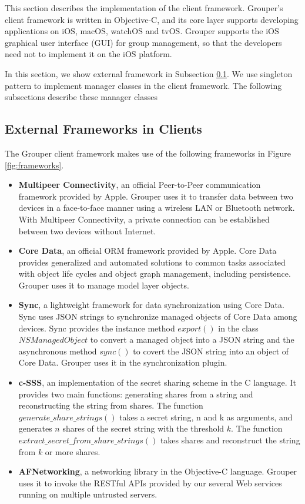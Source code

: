\documentclass[a4paper,11pt]{report}
\begin{document}
This section describes the implementation of the client framework.
Grouper's client framework is written in Objective-C, and its core layer supports developing applications on iOS, macOS, watchOS and tvOS.
Grouper supports the iOS graphical user interface (GUI) for group management, so that the developers need not to implement it on the iOS platform.

In this section, we show external framework in Subsection \ref{subsection:dependencies_client}.
We use singleton pattern to implement manager classes in the client framework.
The following subsections describe these manager classes

\subsection{External Frameworks in Clients} \label{subsection:dependencies_client}

The Grouper client framework makes use of the following frameworks in Figure \ref{fig:frameworks}.

\begin{itemize}[leftmargin=7mm]
	\setlength{\itemsep}{1pt}
	\setlength{\parskip}{0pt}
	\setlength{\parsep}{0pt}
	\item 
	\textbf{Multipeer Connectivity}\cite{mc}, an official Peer-to-Peer communication framework provided by Apple. 
	Grouper uses it to transfer data between two devices in a face-to-face manner using a wireless LAN or Bluetooth network.
	With Multipeer Connectivity, a private connection can be established between two devices without Internet.
	\item 
	\textbf{Core Data}\cite{coredata}, an official ORM framework provided by Apple.
	Core Data provides generalized and automated solutions to common tasks associated with object life cycles and object graph management, including persistence. 
	Grouper uses it to manage model layer objects. 
	\item 
	\textbf{Sync}\cite{sync}, a lightweight framework for data synchronization using Core Data.
	Sync uses JSON strings to synchronize managed objects of Core Data among devices.
	Sync provides the instance method $export()$ in the class $NSManagedObject$ to convert a managed object into a JSON string and the asynchronous method $sync()$ to covert the JSON string into an object of Core Data.
	Grouper uses it in the synchronization plugin.
	\item 
	\textbf{c-SSS}\cite{c-sss}, an implementation of the secret sharing scheme in the C language. 
	It provides two main functions: generating shares from a string and reconstructing the string from shares. The function $generate\_share\_strings()$ takes  a secret string, n and k as arguments, and generates $n$ shares of the secret string with the threshold $k$. The function $extract\_secret\_from\_share\_strings()$ takes shares and reconstruct the string from $k$ or more shares.
	\item 
	\textbf{AFNetworking}\cite{afnetworking}, a networking library in the Objective-C language. 
	Grouper uses it to invoke the RESTful APIs provided by our several Web services running on multiple untrusted servers. 
\end{itemize}
\end{document}
